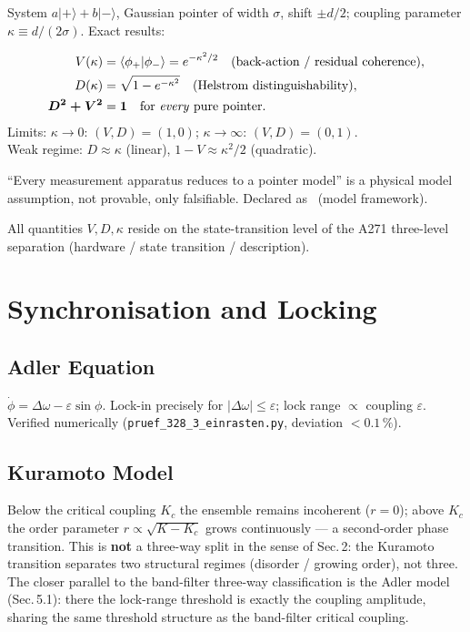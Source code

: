 System $a|+\rangle + b|-\rangle$, Gaussian pointer of width $\sigma$, shift $\pm d/2$;
coupling parameter $\kappa \equiv d/(2\sigma)$. Exact results:

\begin{tcolorbox}[proofbox,title={Exact duality — \B\ (Scripts 5 and 9A)}]
\begin{align}
  V(\kappa) &= \langle\phi_+|\phi_-\rangle = e^{-\kappa^2/2}
    \quad\text{(back-action / residual coherence)},\\
  D(\kappa) &= \sqrt{1 - e^{-\kappa^2}}
    \quad\text{(Helstrom distinguishability)},\\
  \boldsymbol{D^2 + V^2} &= \boldsymbol{1}
    \quad\text{for \emph{every} pure pointer.}
\end{align}
Limits: $\kappa\to0$: $(V,D)=(1,0)$; $\kappa\to\infty$: $(V,D)=(0,1)$.\\
Weak regime: $D\approx\kappa$ (linear), $1-V\approx\kappa^2/2$ (quadratic).
\end{tcolorbox}

\begin{tcolorbox}[warnbox,title={Not closable — \SET}]
``Every measurement apparatus reduces to a pointer model'' is a physical model
assumption, not provable, only falsifiable. Declared as \SET\ (model framework).
\end{tcolorbox}

All quantities $V,D,\kappa$ reside on the state-transition level of the A271
three-level separation (hardware / state transition / description).

\section{Synchronisation and Locking \E}

\subsection{Adler Equation}
$\dot{\phi} = \Delta\omega - \varepsilon\sin\phi$. Lock-in precisely for $|\Delta\omega|\le\varepsilon$;
lock range $\propto$ coupling $\varepsilon$. Verified numerically
(\texttt{pruef\_328\_3\_einrasten.py}, deviation $<0.1\,\%$).

\subsection{Kuramoto Model}
Below the critical coupling $K_c$ the ensemble remains incoherent ($r=0$);
above $K_c$ the order parameter $r\propto\sqrt{K-K_c}$ grows continuously —
a second-order phase transition. This is \textbf{not} a three-way split in the
sense of Sec.\,2: the Kuramoto transition separates two structural regimes
(disorder / growing order), not three. The closer parallel to the band-filter
three-way classification is the Adler model (Sec.\,5.1): there the lock-range
threshold is exactly the coupling amplitude, sharing the same threshold structure
as the band-filter critical coupling.

